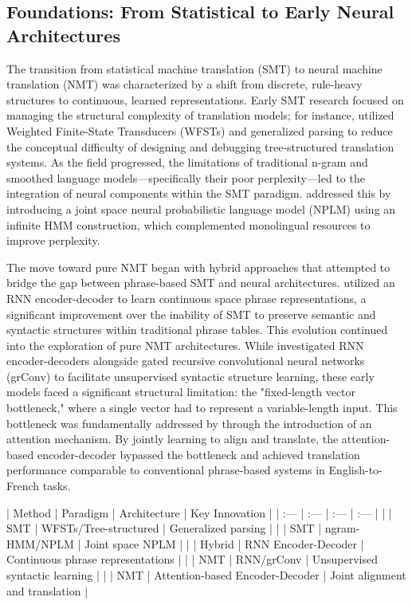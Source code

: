 \documentclass[11pt]{article}
\begin{document}
\subsection{Foundations: From Statistical to Early Neural Architectures}

The transition from statistical machine translation (SMT) to neural machine translation (NMT) was characterized by a shift from discrete, rule-heavy structures to continuous, learned representations. Early SMT research focused on managing the structural complexity of translation models; for instance, \citep{cs/0407005} utilized Weighted Finite-State Transducers (WFSTs) and generalized parsing to reduce the conceptual difficulty of designing and debugging tree-structured translation systems. As the field progressed, the limitations of traditional n-gram and smoothed language models—specifically their poor perplexity—led to the integration of neural components within the SMT paradigm. \citep{1301.3614} addressed this by introducing a joint space neural probabilistic language model (NPLM) using an infinite HMM construction, which complemented monolingual resources to improve perplexity.

The move toward pure NMT began with hybrid approaches that attempted to bridge the gap between phrase-based SMT and neural architectures. \citep{1406.1078} utilized an RNN encoder-decoder to learn continuous space phrase representations, a significant improvement over the inability of SMT to preserve semantic and syntactic structures within traditional phrase tables. This evolution continued into the exploration of pure NMT architectures. While \citep{1409.1259} investigated RNN encoder-decoders alongside gated recursive convolutional neural networks (grConv) to facilitate unsupervised syntactic structure learning, these early models faced a significant structural limitation: the "fixed-length vector bottleneck," where a single vector had to represent a variable-length input. This bottleneck was fundamentally addressed by \citep{1409.0473} through the introduction of an attention mechanism. By jointly learning to align and translate, the attention-based encoder-decoder bypassed the bottleneck and achieved translation performance comparable to conventional phrase-based systems in English-to-French tasks.

| Method | Paradigm | Architecture | Key Innovation |
| :--- | :--- | :--- | :--- |
| \citep{cs/0407005} | SMT | WFSTs/Tree-structured | Generalized parsing |
| \citep{1301.3614} | SMT | ngram-HMM/NPLM | Joint space NPLM |
| \citep{1406.1078} | Hybrid | RNN Encoder-Decoder | Continuous phrase representations |
| \citep{1409.1259} | NMT | RNN/grConv | Unsupervised syntactic learning |
| \citep{1409.0473} | NMT | Attention-based Encoder-Decoder | Joint alignment and translation |
\end{document}
